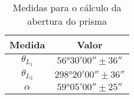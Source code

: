 \begin{table}[H]
	\centering
	\begin{tabular}{cc}
		\toprule\toprule
            {\bfseries Medida} & {\bfseries Valor}
        \\\midrule
            $\theta_{L_1}$ & $\ang{56;30;00}\pm\ang{;;36}$ \\
            $\theta_{L_2}$ & $\ang{298;20;00}\pm\ang{;;36}$
        \\\midrule
            $\alpha$ & $\ang{59;05;00}\pm\ang{;;25}$
        \\\bottomrule\bottomrule
	\end{tabular}

	\caption{Medidas para o cálculo da abertura do prisma}
	\label{tab:apice}
\end{table}